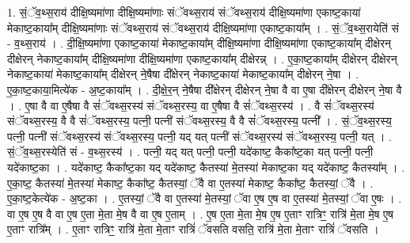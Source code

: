 \documentclass[17pt]{extarticle}
\begin{document}
1. सं॒ॅव॒थ्स॒राय॑ दीक्षि॒ष्यमा॑णा दीक्षि॒ष्यमा॑णाः संॅवथ्स॒राय॑ संॅवथ्स॒राय॑ दीक्षि॒ष्यमा॑णा एकाष्ट॒काया॑ मेकाष्ट॒काया᳚म् दीक्षि॒ष्यमा॑णाः संॅवथ्स॒राय॑ संॅवथ्स॒राय॑ दीक्षि॒ष्यमा॑णा एकाष्ट॒काया᳚म् । . सं॒ॅव॒थ्स॒रायेति॑ सं - व॒थ्स॒राय॑ । . दी॒क्षि॒ष्यमा॑णा एकाष्ट॒काया॑ मेकाष्ट॒काया᳚म् दीक्षि॒ष्यमा॑णा दीक्षि॒ष्यमा॑णा एकाष्ट॒काया᳚म् दीक्षेरन् दीक्षेरन् नेकाष्ट॒काया᳚म् दीक्षि॒ष्यमा॑णा दीक्षि॒ष्यमा॑णा एकाष्ट॒काया᳚म् दीक्षेरन्न् । . ए॒का॒ष्ट॒काया᳚म् दीक्षेरन् दीक्षेरन् नेकाष्ट॒काया॑ मेकाष्ट॒काया᳚म् दीक्षेरन् ने॒षैषा दी᳚क्षेरन् नेकाष्ट॒काया॑ मेकाष्ट॒काया᳚म् दीक्षेरन् ने॒षा । . ए॒का॒ष्ट॒काया॒मित्ये॑क - अ॒ष्ट॒काया᳚म् । . दी॒क्षे॒र॒न् ने॒षैषा दी᳚क्षेरन् दीक्षेरन् ने॒षा वै वा ए॒षा दी᳚क्षेरन् दीक्षेरन् ने॒षा वै । . ए॒षा वै वा ए॒षैषा वै सं॑ॅवथ्स॒रस्य॑ संॅवथ्स॒रस्य॒ वा ए॒षैषा वै सं॑ॅवथ्स॒रस्य॑ । . वै सं॑ॅवथ्स॒रस्य॑ संॅवथ्स॒रस्य॒ वै वै सं॑ॅवथ्स॒रस्य॒ पत्नी॒ पत्नी॑ संॅवथ्स॒रस्य॒ वै वै सं॑ॅवथ्स॒रस्य॒ पत्नी᳚ । . सं॒ॅव॒थ्स॒रस्य॒ पत्नी॒ पत्नी॑ संॅवथ्स॒रस्य॑ संॅवथ्स॒रस्य॒ पत्नी॒ यद् यत् पत्नी॑ संॅवथ्स॒रस्य॑ संॅवथ्स॒रस्य॒ पत्नी॒ यत् । . सं॒ॅव॒थ्स॒रस्येति॑ सं - व॒थ्स॒रस्य॑ । . पत्नी॒ यद् यत् पत्नी॒ पत्नी॒ यदे॑काष्ट॒ कैका᳚ष्ट॒का यत् पत्नी॒ पत्नी॒ यदे॑काष्ट॒का । . यदे॑काष्ट॒ कैका᳚ष्ट॒का यद् यदे॑काष्ट॒ कैतस्या॑ मे॒तस्या॑ मेकाष्ट॒का यद् यदे॑काष्ट॒ कैतस्या᳚म् । . ए॒का॒ष्ट॒ कैतस्या॑ मे॒तस्या॑ मेकाष्ट॒ कैका᳚ष्ट॒ कैतस्यां॒ ॅवै वा ए॒तस्या॑ मेकाष्ट॒ कैका᳚ष्ट॒
कैतस्यां॒ ॅवै । . ए॒का॒ष्ट॒केत्ये॑क - अ॒ष्ट॒का । . ए॒तस्यां॒ ॅवै वा ए॒तस्या॑ मे॒तस्यां॒ ॅवा ए॒ष ए॒ष वा ए॒तस्या॑ मे॒तस्यां॒ ॅवा ए॒षः । . वा ए॒ष ए॒ष वै वा ए॒ष ए॒ता मे॒ता मे॒ष वै वा ए॒ष ए॒ताम् । . ए॒ष ए॒ता मे॒ता मे॒ष ए॒ष ए॒ताꣳ रात्रिꣳ॒॒ रात्रि॑ मे॒ता मे॒ष ए॒ष ए॒ताꣳ रात्रि᳚म् । . ए॒ताꣳ रात्रिꣳ॒॒ रात्रि॑ मे॒ता मे॒ताꣳ रात्रिं॑ ॅवसति वसति॒ रात्रि॑ मे॒ता मे॒ताꣳ रात्रिं॑ ॅवसति । \newline
\end{document}

